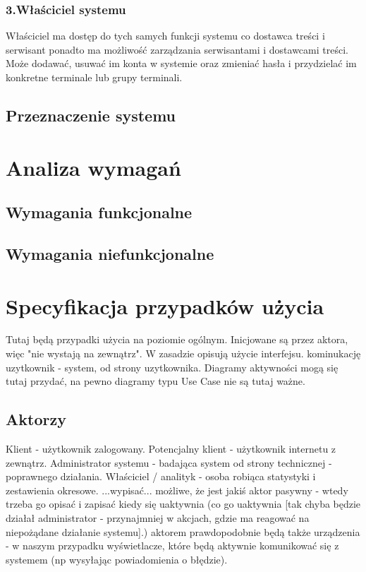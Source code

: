 \documentclass[a4paper,titlepage,twoside,openright]{report} %
\begin{document}
			\subsection{3.Właściciel systemu}
				Właściciel ma dostęp do tych samych funkcji systemu co dostawca treści i serwisant ponadto ma możliwość zarządzania serwisantami i dostawcami treści. Może dodawać, usuwać im konta w systemie oraz zmieniać hasła i przydzielać im konkretne terminale lub grupy terminali.
		\section{Przeznaczenie systemu}

	\chapter{Analiza wymagań}
		\section{Wymagania funkcjonalne}

		\section{Wymagania niefunkcjonalne}

	\cleardoublepage
	\pagestyle{fancy}	
	
	\chapter{Specyfikacja przypadków użycia}	
	
		Tutaj będą przypadki użycia na poziomie ogólnym. Inicjowane są przez aktora, więc "nie wystają na zewnątrz". W zasadzie opisują użycie interfejsu. kominukację uzytkownik - system, od strony uzytkownika.\newline
		Diagramy aktywności mogą się tutaj przydać, na pewno diagramy typu Use Case nie są tutaj ważne.\newline
		\section{Aktorzy}
		Klient - użytkownik zalogowany.\newline
		Potencjalny klient - użytkownik internetu z zewnątrz.\newline
		Administrator systemu - badająca system od strony technicznej - poprawnego działania.\newline
		Właściciel / analityk - osoba robiąca statystyki i zestawienia okresowe.\newline
		...wypisać...\newline
		możliwe, że jest jakiś aktor pasywny - wtedy trzeba go opisać i zapisać kiedy się uaktywnia (co go uaktywnia [tak chyba będzie działał administrator - przynajmniej w akcjach, gdzie ma reagować na niepożądane działanie systemu].)\newline
		aktorem prawdopodobnie będą także urządzenia - w naszym przypadku wyświetlacze, które będą aktywnie komunikować się z systemem (np wysyłając powiadomienia o błędzie).\newline
\end{document}
